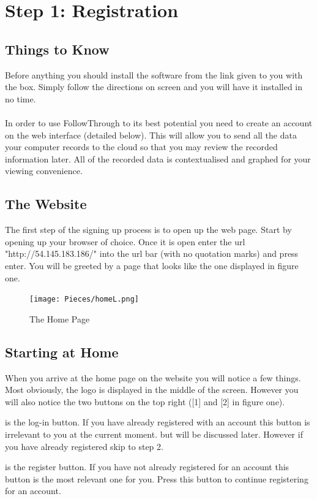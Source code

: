 \chapter{Step 1: Registration}

\setlength{\parindent}{0cm}

\section{Things to Know}
Before anything you should install the software from the link given to you with the box. Simply follow the directions on screen and you will have it installed in no time.
\\ \\
In order to use FollowThrough to its best potential you need to create an account on the web interface (detailed below). This will allow you to send all the data your computer records to the cloud so that you may review the recorded information later. All of the recorded data is contextualised and graphed for your viewing convenience.

\section{The Website}
The first step of the signing up process is to open up the web page. Start by opening up your browser of choice. Once it is open enter the url "http://54.145.183.186/" into the url bar (with no quotation marks) and press enter. You will be greeted by a page that looks like the one displayed in figure one.
\begin{figure}[h]
    \caption{The Home Page}
    \texttt{[image: Pieces/homeL.png]}
\end{figure}

\section{Starting at Home}
When you arrive at the home page on the website you will notice a few things. Most obviously, the logo is displayed in the middle of the screen. However you will also notice the two buttons on the top right ([1] and [2] in figure one).

\begin{enumerate}[{[1]}]
\item is the log-in button. If you have already registered with an account this button is irrelevant to you at the current moment. but will be discussed later. However if you have already registered skip to step 2.
\item is the register button. If you have not already registered for an account this button is the most relevant one for you. Press this button to continue registering for an account.
\end{enumerate}

